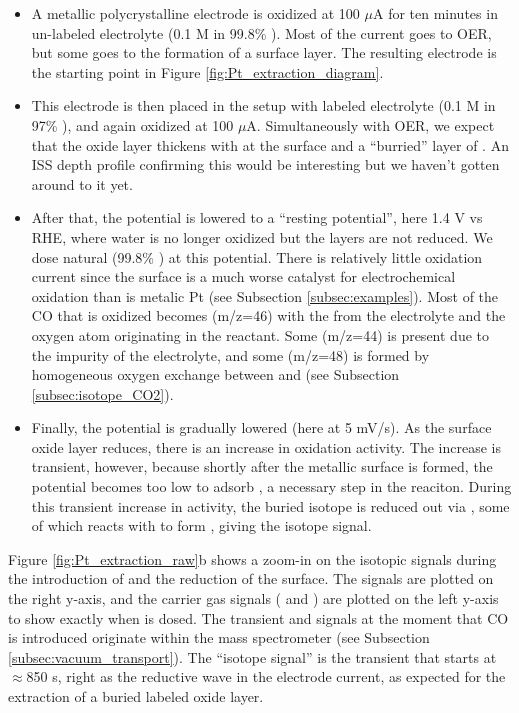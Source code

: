 \begin{itemize}
\item A metallic polycrystalline  electrode is oxidized at 100 $\mu$A for ten minutes in un-labeled electrolyte (0.1 M  in 99.8\% ). Most of the current goes to OER, but some goes to the formation of a  surface layer. The resulting electrode is the starting point in Figure \ref{fig:Pt_extraction_diagram}.

\item This electrode is then placed in the setup with labeled electrolyte (0.1 M  in 97\% ), and again oxidized at 100 $\mu$A. Simultaneously with OER, we expect that the oxide layer thickens with  at the surface and a ``burried'' layer of . An ISS depth profile confirming this would be interesting but we haven't gotten around to it yet. 

\item After that, the potential is lowered to a ``resting potential'', here 1.4 V vs RHE, where water is no longer oxidized but the  layers are not reduced. We dose natural  (99.8\% ) at this potential. There is relatively little  oxidation current since the  surface is a much worse catalyst for electrochemical  oxidation than is metalic Pt (see Subsection \ref{subsec:examples}). Most of the CO that is oxidized becomes  (m/z=46) with the  from the electrolyte and the  oxygen atom originating in the  reactant. Some  (m/z=44) is present due to the impurity of the electrolyte, and some  (m/z=48) is formed by homogeneous oxygen exchange between  and  (see Subsection \ref{subsec:isotope_CO2}).

\item Finally, the potential is gradually lowered (here at 5 mV/s). As the surface oxide layer reduces, there is an increase in  oxidation activity. The increase is transient, however, because shortly after the metallic surface is formed, the potential becomes too low to adsorb , a necessary step in the reaciton. During this transient increase in activity, the buried  isotope is reduced out via , some of which reacts with  to form , giving the isotope signal.
\end{itemize}

Figure \ref{fig:Pt_extraction_raw}b shows a zoom-in on the  isotopic signals during the introduction of  and the reduction of the surface. The  signals are plotted on the right y-axis, and the carrier gas signals ( and ) are plotted on the left y-axis to show exactly when  is dosed. The transient  and  signals at the moment that CO is introduced originate within the mass spectrometer (see Subsection \ref{subsec:vacuum_transport}). The ``isotope signal'' is the   transient that starts at $\approx$850 s, right as the reductive wave in the electrode current, as expected for the extraction of a buried labeled oxide layer. 

